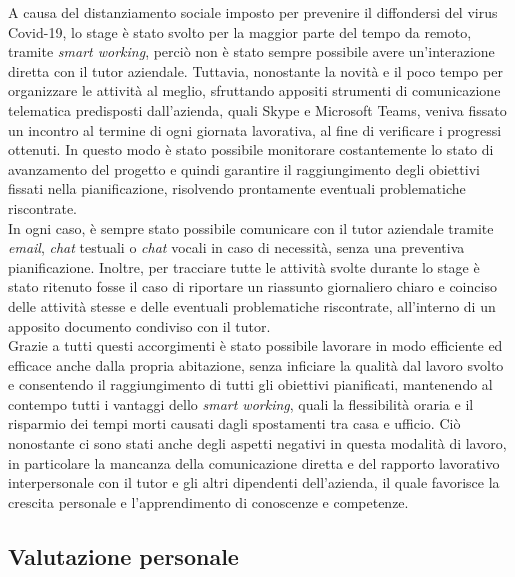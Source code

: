 A causa del distanziamento sociale imposto per prevenire il diffondersi del virus Covid-19, lo stage è stato svolto per la maggior parte del tempo da remoto, tramite \textit{smart working}, perciò non è stato sempre possibile avere un'interazione diretta con il tutor aziendale. Tuttavia, nonostante la novità e il poco tempo per organizzare le attività al meglio, sfruttando appositi strumenti di comunicazione telematica predisposti dall'azienda, quali Skype e Microsoft Teams, veniva fissato un incontro al termine di ogni giornata lavorativa, al fine di verificare i progressi ottenuti. In questo modo è stato possibile monitorare costantemente lo stato di avanzamento del progetto e quindi garantire il raggiungimento degli obiettivi fissati nella pianificazione, risolvendo prontamente eventuali problematiche riscontrate.\\
In ogni caso, è sempre stato possibile comunicare con il tutor aziendale tramite \textit{email}, \textit{chat} testuali o \textit{chat} vocali in caso di necessità, senza una preventiva pianificazione. Inoltre, per tracciare tutte le attività svolte durante lo stage è stato ritenuto fosse il caso di riportare un riassunto giornaliero chiaro e coinciso delle attività stesse e delle eventuali problematiche riscontrate, all’interno di un apposito documento condiviso con il tutor.\\
Grazie a tutti questi accorgimenti è stato possibile lavorare in modo efficiente ed efficace anche dalla propria abitazione, senza inficiare la qualità dal lavoro svolto e consentendo il raggiungimento di tutti gli obiettivi pianificati, mantenendo al contempo tutti i vantaggi dello \textit{smart working}, quali la flessibilità oraria e il risparmio dei tempi morti causati dagli spostamenti tra casa e ufficio. Ciò nonostante ci sono stati anche degli aspetti negativi in questa modalità di lavoro, in particolare la mancanza della comunicazione diretta e del rapporto lavorativo interpersonale con il tutor e gli altri dipendenti dell'azienda, il quale favorisce la crescita personale e l'apprendimento di conoscenze e competenze.

\subsection{Valutazione personale}

